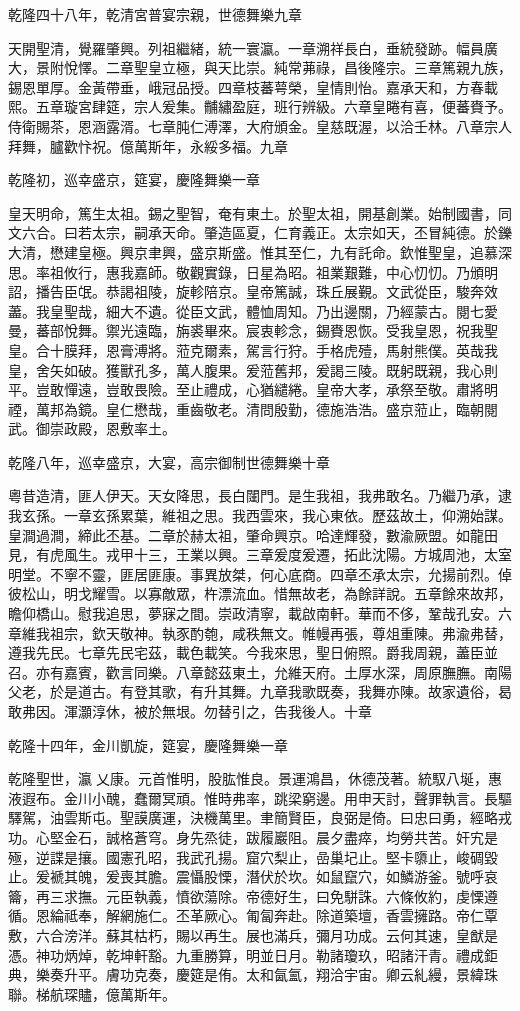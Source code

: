 \begin{pinyinscope}
乾隆四十八年，乾清宮普宴宗親，世德舞樂九章

天開聖清，覺羅肇興。列祖繼緒，統一寰瀛。一章溯祥長白，垂統發跡。幅員廣大，景附悅懌。二章聖皇立極，與天比崇。純常茀祿，昌後隆宗。三章篤親九族，錫恩單厚。金黃帶垂，峨冠品授。四章枝蕃萼榮，皇情則怡。嘉承天和，方春載熙。五章璇宮肆筵，宗人爰集。黼繡盈庭，班行辨級。六章皇睠有喜，便蕃賚予。侍衛賜茶，恩涵露湑。七章肫仁溥澤，大府頒金。皇慈既渥，以洽壬林。八章宗人拜舞，臚歡忭祝。億萬斯年，永綏多福。九章

乾隆初，巡幸盛京，筵宴，慶隆舞樂一章

皇天明命，篤生太祖。錫之聖智，奄有東土。於聖太祖，開基創業。始制國書，同文六合。曰若太宗，嗣承天命。肇造區夏，仁育義正。太宗如天，丕冒純德。於鑠大清，懋建皇極。興京聿興，盛京斯盛。惟其至仁，九有託命。欽惟聖皇，追慕深思。率祖攸行，惠我嘉師。敬觀實錄，日星為昭。祖業艱難，中心忉忉。乃頒明詔，播告臣氓。恭謁祖陵，旋軫陪京。皇帝篤誠，珠丘展覲。文武從臣，駿奔效藎。我皇聖哉，細大不遺。從臣文武，體恤周知。乃出邊關，乃經蒙古。閱七愛曼，蕃部悅舞。禦光遠臨，旃裘畢來。宸衷軫念，錫賚恩恢。受我皇恩，祝我聖皇。合十膜拜，恩膏溥將。蒞克爾素，駕言行狩。手格虎殪，馬射熊僕。英哉我皇，舍矢如破。獲獸孔多，萬人腹果。爰蒞舊邦，爰謁三陵。既躬既親，我心則平。豈敢憚遠，豈敢畏險。至止禮成，心猶繾綣。皇帝大孝，承祭至敬。肅將明禋，萬邦為鏡。皇仁懋哉，重齒敬老。清問殷勤，德施浩浩。盛京蒞止，臨朝閱武。御崇政殿，恩敷率土。

乾隆八年，巡幸盛京，大宴，高宗御制世德舞樂十章

粵昔造清，匪人伊天。天女降思，長白闥門。是生我祖，我弗敢名。乃繼乃承，逮我玄孫。一章玄孫累葉，維祖之思。我西雲來，我心東依。歷茲故土，仰溯始謀。皇澗過澗，締此丕基。二章於赫太祖，肇命興京。哈達輝發，數渝厥盟。如龍田見，有虎風生。戎甲十三，王業以興。三章爰度爰遷，拓此沈陽。方城周池，太室明堂。不寧不靈，匪居匪康。事異放桀，何心底商。四章丕承太宗，允揚前烈。倬彼松山，明戈耀雪。以寡敵眾，杵漂流血。惜無故老，為餘詳說。五章餘來故邦，瞻仰橋山。慰我追思，夢寐之間。崇政清寧，載啟南軒。華而不侈，鞏哉孔安。六章維我祖宗，欽天敬神。執豕酌匏，咸秩無文。帷幔再張，尊俎重陳。弗渝弗替，遵我先民。七章先民宅茲，載色載笑。今我來思，聖日俯照。爵我周親，藎臣並召。亦有嘉賓，歡言同樂。八章懿茲東土，允維天府。土厚水深，周原膴膴。南陽父老，於是道古。有登其歌，有升其舞。九章我歌既奏，我舞亦陳。故家遺俗，曷敢弗因。渾灝淳休，被於無垠。勿替引之，告我後人。十章

乾隆十四年，金川凱旋，筵宴，慶隆舞樂一章

乾隆聖世，瀛乂康。元首惟明，股肱惟良。景運鴻昌，休德茂著。統馭八埏，惠液遐布。金川小醜，蠢爾冥頑。惟時弗率，跳梁窮邊。用申天討，聲罪執言。長驅驛駕，油雲斯屯。聖謨廣運，決機萬里。聿簡賢臣，良弼是倚。曰忠曰勇，經略戎功。心堅金石，誠格蒼穹。身先烝徒，跋履巖阻。晨夕盡瘁，均勞共苦。奸宄是殛，逆諜是攘。國憲孔昭，我武孔揚。窟穴梨止，嵒巢圮止。堅卡隳止，峻碉毀止。爰褫其魄，爰喪其膽。震懾股慄，潛伏於坎。如鼠竄穴，如鱗游釜。號呼哀籥，再三求撫。元臣執義，憤欲蕩除。帝德好生，曰免駢誅。六條攸約，虔慄遵循。恩綸祗奉，解網施仁。丕革厥心。匍匐奔赴。除道築壇，香雲擁路。帝仁覃敷，六合滂洋。蘇其枯朽，賜以再生。展也滿兵，彌月功成。云何其速，皇猷是憑。神功炳焯，乾坤軒豁。九重勝算，明並日月。勒諸瓊玖，昭諸汗青。禮成鉅典，樂奏升平。膚功克奏，慶筵是侑。太和氤氳，翔洽宇宙。卿云糺縵，景緯珠聯。梯航琛贐，億萬斯年。


\end{pinyinscope}
